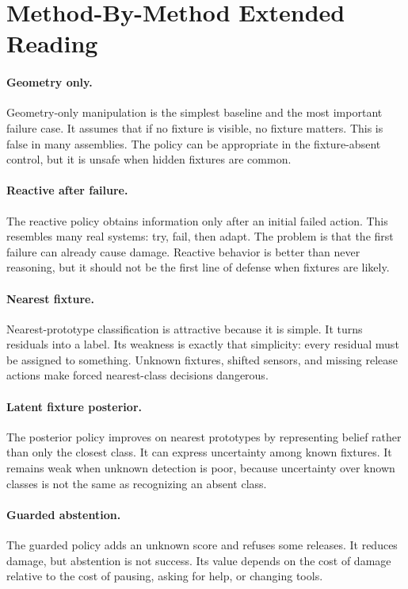 \documentclass{article}
\begin{document}
\section{Method-By-Method Extended Reading}

\paragraph{Geometry only.}
Geometry-only manipulation is the simplest baseline and the most important
failure case. It assumes that if no fixture is visible, no fixture matters.
This is false in many assemblies. The policy can be appropriate in the
fixture-absent control, but it is unsafe when hidden fixtures are common.

\paragraph{Reactive after failure.}
The reactive policy obtains information only after an initial failed action.
This resembles many real systems: try, fail, then adapt. The problem is that
the first failure can already cause damage. Reactive behavior is better than
never reasoning, but it should not be the first line of defense when fixtures
are likely.

\paragraph{Nearest fixture.}
Nearest-prototype classification is attractive because it is simple. It turns
residuals into a label. Its weakness is exactly that simplicity: every
residual must be assigned to something. Unknown fixtures, shifted sensors, and
missing release actions make forced nearest-class decisions dangerous.

\paragraph{Latent fixture posterior.}
The posterior policy improves on nearest prototypes by representing belief
rather than only the closest class. It can express uncertainty among known
fixtures. It remains weak when unknown detection is poor, because uncertainty
over known classes is not the same as recognizing an absent class.

\paragraph{Guarded abstention.}
The guarded policy adds an unknown score and refuses some releases. It reduces
damage, but abstention is not success. Its value depends on the cost of damage
relative to the cost of pausing, asking for help, or changing tools.
\end{document}
